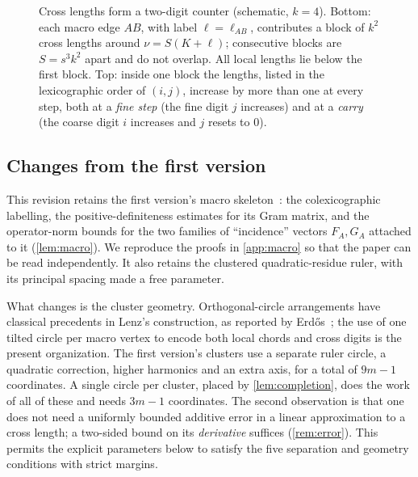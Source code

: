 \documentclass[11pt]{amsart}
\numberwithin{equation}{section}
\theoremstyle{definition}
\theoremstyle{remark}
\newcommand{\Tmax}{T_{\max}}
\begin{document}
\begin{figure}[t]
\caption{Cross lengths form a two-digit counter (schematic, $k=4$).
Bottom: each macro edge $AB$, with label $\ell=\ell_{AB}$, contributes a
block of $k^2$ cross lengths around $\nu=S(K+\ell)$; consecutive blocks are
$S=s^3k^2$ apart and do not overlap. All local lengths lie below the first
block. Top: inside one block the lengths, listed in the lexicographic
order of $(i,j)$, increase by more than one at every step, both at a
\emph{fine step} (the fine digit $j$ increases) and at a \emph{carry} (the
coarse digit $i$ increases and $j$ resets to $0$).}
\label{fig:counter}
\end{figure}

\subsection{Changes from the first version}

This revision retains the first version's macro skeleton~\cite{Tripodo}: the
colexicographic labelling, the positive-definiteness estimates for its
Gram matrix, and the operator-norm bounds for the two families of
``incidence'' vectors $F_A,G_A$ attached to it (\cref{lem:macro}). We
reproduce the proofs in \cref{app:macro} so that the paper can be read
independently. It also retains the clustered quadratic-residue ruler,
with its principal spacing made a free parameter.

What changes is the cluster geometry. Orthogonal-circle arrangements have
classical precedents in Lenz's construction, as reported by
Erd\H{o}s~\cite{ErdosLenz}; the use of one tilted circle per macro vertex
to encode both local chords and cross digits is the present organization.
The first version's clusters use a separate
ruler circle, a quadratic correction, higher harmonics and an extra axis,
for a total of $9m-1$ coordinates. A single circle per cluster, placed by
\cref{lem:completion}, does the work of all of these and needs $3m-1$
coordinates. The second observation is that one does not need a uniformly
bounded additive error in a linear approximation to a cross length; a
two-sided bound on its \emph{derivative} suffices (\cref{rem:error}). This
permits the explicit parameters below to satisfy the five separation and
geometry conditions with strict margins.
\end{document}
